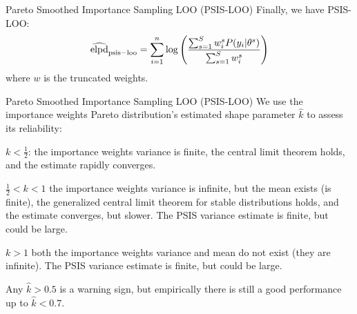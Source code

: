 \begin{frame}{Pareto Smoothed Importance Sampling LOO (PSIS-LOO)}
	Finally, we have PSIS-LOO:
	$$
		\widehat{\operatorname{elpd}}_{\rm psis-loo} =
		\sum_{i=1}^n \log
		\left(\frac{\sum_{s=1}^S w_i^s P(y_i|\theta^s)}{\sum_{s=1}^Sw_i^s} \right)
	$$
	where $w$ is the truncated weights.
\end{frame}

\begin{frame}{Pareto Smoothed Importance Sampling LOO (PSIS-LOO)}
	\small
	We use the importance weights Pareto distribution's estimated shape parameter
	$\widehat{k}$ to assess its reliability:
	\begin{vfilleditems}
		\item \small $k < \frac{1}{2}$: the importance weights variance is finite,
		the central limit theorem holds, and the estimate rapidly converges.
		\item \small $\frac{1}{2} < k < 1$ the importance weights variance is infinite,
		but the mean exists (is finite),
		the generalized central limit theorem for stable distributions holds,
		and the estimate converges, but slower.
		The PSIS variance estimate is finite, but could be large.
		\item \small $k > 1$ both the importance weights variance and mean do not exist
		(they are infinite).
		The PSIS variance estimate is finite, but could be large.
	\end{vfilleditems}
	\vfill
	\small
	Any $\widehat{k} > 0.5$ is a warning sign,
	but empirically there is still a good performance up to $\widehat{k} < 0.7$.
\end{frame}
